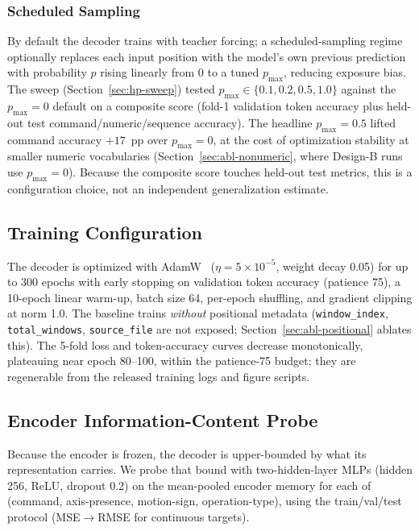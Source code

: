 \documentclass[sensors,article,submit,moreauthors,pdftex]{Definitions/mdpi}
\begin{document}
\subsubsection{Scheduled Sampling}
\label{sec:scheduled-sampling}

By default the decoder trains with teacher forcing; a scheduled-sampling regime~\cite{scheduled_sampling} optionally replaces each input position with the model's own previous prediction with probability $p$ rising linearly from $0$ to a tuned $p_{\text{max}}$, reducing exposure bias. The sweep (Section~\ref{sec:hp-sweep}) tested $p_{\text{max}} \in \{0.1, 0.2, 0.5, 1.0\}$ against the $p_{\text{max}}\!=\!0$ default on a composite score (fold-1 validation token accuracy plus held-out test command/numeric/sequence accuracy). The headline $p_{\text{max}}\!=\!0.5$ lifted command accuracy $+17$~pp over $p_{\text{max}}\!=\!0$, at the cost of optimization stability at smaller numeric vocabularies (Section~\ref{sec:abl-nonumeric}, where Design-B runs use $p_{\text{max}}\!=\!0$). Because the composite score touches held-out test metrics, this is a configuration choice, not an independent generalization estimate.

\subsection{Training Configuration}
\label{sec:training}

The decoder is optimized with AdamW~\cite{loshchilov2019adamw} ($\eta = 5 \times 10^{-5}$, weight decay 0.05) for up to 300 epochs with early stopping on validation token accuracy (patience 75), a 10-epoch linear warm-up, batch size 64, per-epoch shuffling, and gradient clipping at norm 1.0. The baseline trains \emph{without} positional metadata (\texttt{window\_index}, \texttt{total\_windows}, \texttt{source\_file} are not exposed; Section~\ref{sec:abl-positional} ablates this). The 5-fold loss and token-accuracy curves decrease monotonically, plateauing near epoch 80--100, within the patience-75 budget; they are regenerable from the released training logs and figure scripts.

\subsection{Encoder Information-Content Probe}
\label{sec:encoder-probe}

Because the encoder is frozen, the decoder is upper-bounded by what its representation carries. We probe that bound with two-hidden-layer MLPs (hidden 256, ReLU, dropout 0.2) on the mean-pooled encoder memory for each of (command, axis-presence, motion-sign, operation-type), using the train/val/test protocol (MSE$\to$RMSE for continuous targets).
\end{document}
